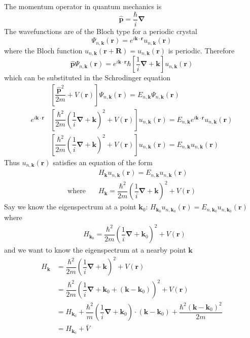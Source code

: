 \documentclass[aps,prb,onecolumn,notitlepage,showpacs,floatfix,superscriptaddress]{revtex4-1}
\newcommand{\bk}{{\bm k}}
\newcommand{\bkz}{{\bm k_0}}
\newcommand{\br}{{\bm r}}
\newcommand{\bR}{{\bm R}}
\newcommand{\op}{\hat{\bm p}}
\newcommand{\bn}{{\bm \nabla}}
\begin{document}
The momentum operator in quantum mechanics is
\begin{equation}
\op = \dfrac{\hbar}{i} \bn
\end{equation}
The wavefunctions are of the Bloch type for a periodic crystal
\begin{equation}
\Psi_{n,\bk}(\br) = e^{i\bk\cdot\br} u_{n,\bk}(\br)
\end{equation}
where the Bloch function $u_{n,\bk}(\br +\bR)=u_{n,\bk}(\br)$ is periodic. Therefore
\begin{equation}
\op \Psi_{n,\bk}(\br)  = e^{i \bk \cdot \br} \hbar \left[ \dfrac{1}{i} \bn + \bk \right] u_{n,\bk}(\br)
\end{equation}
which can be substituted in the Schrodinger equation
\begin{equation}
\begin{split}
&\left[ \dfrac{\op^2}{2 m} + V(\br) \right] \Psi_{n,\bk}(\br) = E_{n,\bk} \Psi_{n,\bk}(\br) \\
 e^{i \bk\cdot\br} &\left[\dfrac{\hbar^2}{2m}\left( \dfrac{1}{i} \bn+ \bk\right)^2 + V(\br) \right] u_{n,\bk}(\br) = E_{n,\bk} e^{i \bk\cdot\br} u_{n,\bk}(\br) \\
 &\left[\dfrac{\hbar^2}{2m}\left( \dfrac{1}{i} \bn+ \bk\right)^2 + V(\br) \right] u_{n,\bk}(\br) = E_{n,\bk} u_{n,\bk}(\br)
\end{split}
\end{equation}
Thus $u_{n,\bk}(\br)$ satisfies an equation of the form
\begin{equation}
\begin{split}
&H_{\bk} u_{n,\bk}(\br) = E_{n,\bk}u_{n,\bk}(\br) \\
\text{where} \quad & H_{\bk} = \dfrac{\hbar^2}{2m}\left( \dfrac{1}{i} \bn+ \bk\right)^2 + V(\br) 
\end{split}
\end{equation}
Say we know the eigenspectrum at a point $\bkz$: $H_{\bkz} u_{n,\bkz}(\br) = E_{n,\bkz}u_{n,\bkz}(\br)$ where
\begin{equation}
\begin{split}
& H_{\bkz} = \dfrac{\hbar^2}{2m}\left( \dfrac{1}{i} \bn+ \bkz\right)^2 + V(\br) 
\end{split}
\end{equation}
and we want to know the eigenspectrum at a nearby point $\bk$
\begin{equation}
\begin{split}
H_{\bk} &= \dfrac{\hbar^2}{2m}\left( \dfrac{1}{i} \bn+ \bk\right)^2 + V(\br)  \\
&=\dfrac{\hbar^2}{2m}\left( \dfrac{1}{i} \bn+ \bkz + (\bk-\bkz)\right)^2 + V(\br) \\
&= H_{\bkz} + \dfrac{\hbar^2}{m}\left( \dfrac{1}{i} \bn+ \bkz \right) \cdot  (\bk-\bkz) + \dfrac{\hbar^2  (\bk-\bkz)^2}{2m} \\
&=H_\bkz + \bar{V}
\end{split}
\end{equation}
\end{document}
